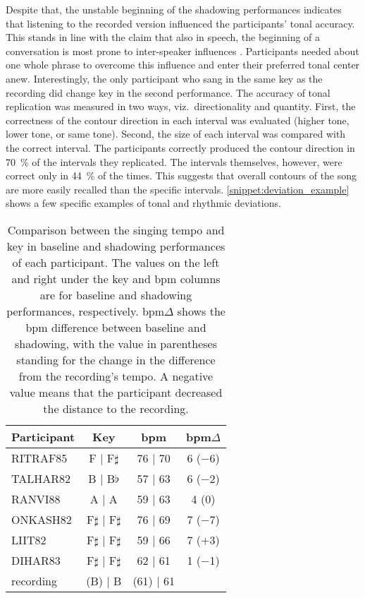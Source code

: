 Despite that, the unstable beginning of the shadowing performances indicates that listening to the recorded version influenced the participants' tonal accuracy.
This stands in line with the claim that also in speech, the beginning of a conversation is most prone to inter-speaker influences \citep[e.g.][]{Orlob2018nine}.
Participants needed about one whole phrase to overcome this influence and enter their preferred tonal center anew.
Interestingly, the only participant who sang in the same key as the recording did change key in the second performance.
The accuracy of tonal replication was measured in two ways, viz.\ directionality and quantity.
First, the correctness of the contour direction in each interval was evaluated (higher tone, lower tone, or same tone).
Second, the size of each interval was compared with the correct interval.
The participants correctly produced the contour direction in \SI{70}{\percent} of the intervals they replicated.
The intervals themselves, however, were correct only in \SI{44}{\percent} of the times.
This suggests that overall contours of the song are more easily recalled than the specific intervals.
\cref{snippet:deviation_example} shows a few specific examples of tonal and rhythmic deviations.
%
\begin{table}
	\caption[Key and \acs{bpm} deviation summary]
			{Comparison between the singing tempo and key in baseline and shadowing performances of each participant.
			The values on the left and right under the key and \acs{bpm} columns are for baseline and shadowing performances, respectively.
			\acs{bpm}$\Delta$ shows the \acs{bpm} difference between baseline and shadowing, with the value in parentheses standing for the change in the difference from the recording's tempo.
			A negative value means that the participant decreased the distance to the recording.}
	\label{tab:bpm_and_keys}
	\centering
	\begin{tabularx}{\linewidth}{Xccc}
		\toprule
		\bfseries{Participant}	& \bfseries{Key}			& \bfseries{\acs{bpm}}		& \bfseries{\acs{bpm}$\Delta$}	\\
		\midrule
		RITRAF85				& F  |  F$\sharp$			& 76  |  70					&  6 ($-$6)						\\
		TALHAR82				& B  |  B$\flat$			& 57  |  63					&  6 ($-$2)						\\
		RANVI88					& A  |  A					& 59  |  63					&  4 (\phantom{$-$}0)			\\
		ONKASH82				& F$\sharp$  |  F$\sharp$	& 76  |  69					&  7 ($-$7)						\\
		LIIT82					& F$\sharp$  |  F$\sharp$	& 59  |  66					&  7 ($+$3)						\\
		DIHAR83					& F$\sharp$  |  F$\sharp$	& 62  |  61					&  1 ($-$1)						\\
		\rule{0pt}{0.5cm}%
		recording				& (B) | B					& (61) | 61					&								\\
		\bottomrule
	\end{tabularx}
\end{table}

